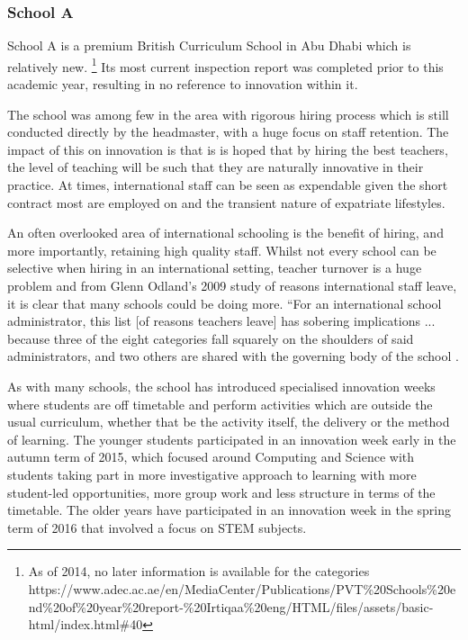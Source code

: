 \documentclass[11pt]{article}
\begin{document}
\subsubsection{School A}
School A is a premium British Curriculum School in Abu Dhabi which is relatively new. \footnote{As of 2014, no later information is available for the categories https://www.adec.ac.ae/en/MediaCenter/Publications/PVT\%20Schools\%20end\%20of\%20year\%20report-\%20Irtiqaa\%20eng/HTML/files/assets/basic-html/index.html\#40}  Its most current inspection report was completed prior to this academic year, resulting in no reference to innovation within it.

The school was among few in the area with rigorous hiring process which is still conducted directly by the headmaster, with a huge focus on staff retention. The impact of this on innovation is that is is hoped that by hiring the best teachers, the level of teaching will be such that they are naturally innovative in their practice. At times, international staff can be seen as expendable given the short contract most are employed on and the transient nature of expatriate lifestyles.

An often overlooked area of international schooling is the benefit of hiring, and more importantly, retaining high quality staff. Whilst not every school can be selective when hiring in an international setting, teacher turnover is a huge problem and from Glenn Odland's 2009 study of reasons international staff leave, it is clear that many schools could be doing more. ``For an international school administrator, this list [of reasons teachers leave] has sobering implications ... because three of the eight categories fall squarely on the shoulders of said administrators, and two others are shared with the governing body of the school \cite[p. 23]{Odland2009}.

As with many schools, the school has introduced specialised innovation weeks where students are off timetable and perform activities which are outside the usual curriculum, whether that be the activity itself, the delivery or the method of learning. The younger students participated in an innovation week early in the autumn term of 2015, which focused around Computing and Science with students taking part in more investigative approach to learning with more student-led opportunities, more group work and less structure in terms of the timetable. The older years have participated in an innovation week in the spring term of 2016 that involved a focus on STEM subjects. 
\end{document}
